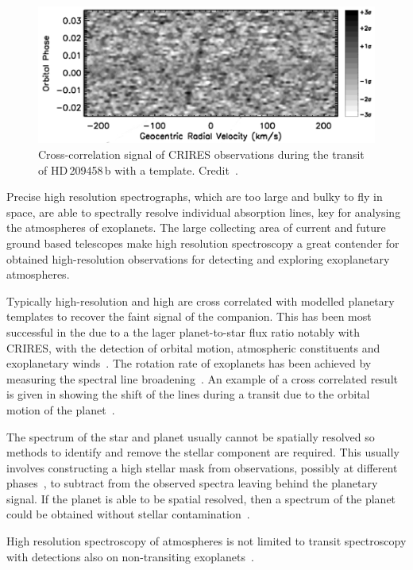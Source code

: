 \begin{figure}
    \centering
    \includegraphics[width=0.7\linewidth]{figures/introduction/snellen2010}
    \caption{Cross-correlation signal of CRIRES observations during the transit of HD\,209458\,b with a  template. Credit~\citet{snellen_orbital_2010}.}
    \label{fig:snellen2010}
\end{figure}

Precise high resolution spectrographs, which are too large and bulky to fly in space, are able to spectrally resolve individual absorption lines, key for analysing the atmospheres of exoplanets. The large collecting area of current and future ground based telescopes make high resolution spectroscopy a great contender for obtained high-resolution observations for detecting and exploring exoplanetary atmospheres.

Typically high-resolution and high \snr{} are cross correlated with modelled planetary templates to recover the faint signal of the companion. This has been most successful in the \nir{} due to a the lager planet-to-star flux ratio
notably with CRIRES, with the detection of orbital motion, atmospheric constituents and exoplanetary winds~\citep[e.g.][]{snellen_orbital_2010, dekok_detection_2013, brogi_carbon_2014, brogi_rotation_2016, schwarz_evidence_2015}. The rotation rate of exoplanets has been achieved by measuring the spectral line broadening~\citep{snellen_fast_2014, brogi_rotation_2016}. An example of a cross correlated result is given in  showing the shift of the  lines during a transit due to the orbital motion of the planet~\citep{snellen_orbital_2010}.

The spectrum of the star and planet usually cannot be spatially resolved so methods to identify and remove the stellar component are required. This usually involves constructing a high \snr{} stellar mask from observations, possibly at different phases~\citep[e.g.][]{rodler_weighing_2012}, to subtract from the observed spectra leaving behind the planetary signal.  If the planet is able to be spatial resolved, then a spectrum of the planet could be obtained without stellar contamination~\citep[e.g.][]{snellen_combining_2015}.

High resolution spectroscopy of atmospheres is not limited to transit spectroscopy with detections also on non-transiting exoplanets~\citet{brogi_signature_2012, brogi_carbon_2014,lockwood_nearir_2014, piskorz_evidence_2016}.
